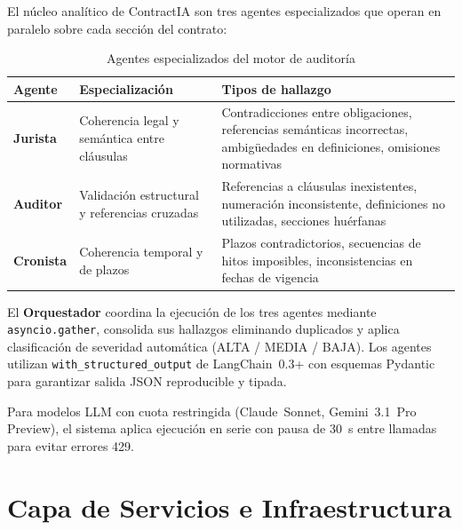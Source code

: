 El núcleo analítico de ContractIA son tres agentes especializados que operan
en paralelo sobre cada sección del contrato:

\begin{table}[H]
\centering
\caption{Agentes especializados del motor de auditoría}
\label{tab:agentes}
\begin{tabular}{p{2.5cm} p{5cm} p{6cm}}
\toprule
\textbf{Agente} & \textbf{Especialización} & \textbf{Tipos de hallazgo} \\
\midrule
\textbf{Jurista} &
  Coherencia legal y semántica entre cláusulas &
  Contradicciones entre obligaciones, referencias semánticas incorrectas,
  ambigüedades en definiciones, omisiones normativas \\[4pt]
\textbf{Auditor} &
  Validación estructural y referencias cruzadas &
  Referencias a cláusulas inexistentes, numeración inconsistente,
  definiciones no utilizadas, secciones huérfanas \\[4pt]
\textbf{Cronista} &
  Coherencia temporal y de plazos &
  Plazos contradictorios, secuencias de hitos imposibles,
  inconsistencias en fechas de vigencia \\
\bottomrule
\end{tabular}
\end{table}

El \textbf{Orquestador} coordina la ejecución de los tres agentes mediante
\texttt{asyncio.gather}, consolida sus hallazgos eliminando duplicados y
aplica clasificación de severidad automática (ALTA / MEDIA / BAJA).
Los agentes utilizan \texttt{with\_structured\_output} de LangChain~0.3+
con esquemas Pydantic para garantizar salida JSON reproducible y tipada.

Para modelos LLM con cuota restringida (Claude~Sonnet, Gemini~3.1~Pro
Preview), el sistema aplica ejecución en serie con pausa de 30~s entre
llamadas para evitar errores 429.

\section{Capa de Servicios e Infraestructura}

